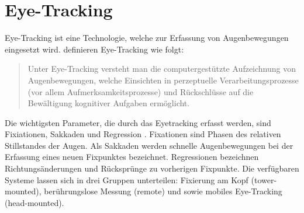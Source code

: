 \section{Eye-Tracking}
Eye-Tracking ist eine Technologie, welche zur Erfassung von Augenbewegungen eingesetzt wird. \citeauthor{BartlPokorny.2013} definieren Eye-Tracking wie folgt: 

\begin{quote}
	\glqq Unter Eye-Tracking versteht man die computergestützte Aufzeichnung von Augenbewegungen, welche Einsichten in perzeptuelle Verarbeitungsprozesse (vor allem Aufmerksamkeitsprozesse) und Rückschlüsse auf die Bewältigung kognitiver Aufgaben ermöglicht.\grqq \cite{BartlPokorny.2013} 
\end{quote}

Die wichtigsten Parameter, die durch das Eyetracking erfasst werden, sind Fixiationen, Sakkaden und Regression \cite{BartlPokorny.2013}. \glqq Fixationen sind Phasen des relativen Stillstandes der Augen.\grqq \cite{Blake.2013} Als Sakkaden werden schnelle Augenbewegungen bei der Erfassung eines neuen Fixpunktes bezeichnet. Regressionen bezeichnen Richtungsänderungen und Rücksprünge zu vorherigen Fixpunkte. Die verfügbaren Systeme lassen sich in drei Gruppen unterteilen: Fixierung am Kopf (tower-mounted), berührungslose Messung (remote) und sowie mobiles Eye-Tracking (head-mounted). \cite{BartlPokorny.2013}

